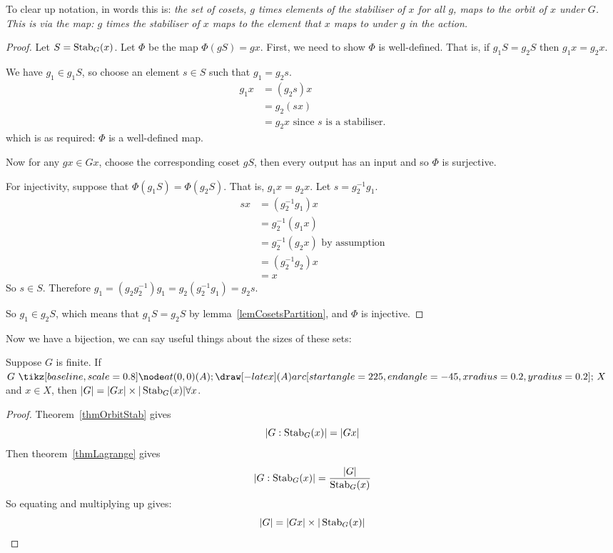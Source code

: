 \documentclass[../Main.tex]{subfiles}
\begin{document}
To clear up notation, in words this is: \textit{the set of cosets, $g$ times elements of the stabiliser of $x$ for all $g$, maps to the orbit of $x$ under $G$. This is via the map: $g$ times the stabiliser of $x$ maps to the element that $x$ maps to under $g$ in the action.}
\begin{proof}
    Let $S = \operatorname{Stab}_G(x)$. Let $\Phi$ be the map $\Phi(gS) = gx$.
    First, we need to show $\Phi$ is well-defined. That is, if $g_1 S = g_2 S$ then $g_1 x = g_2 x$.\par
    We have $g_1 \in g_1 S$, so choose an element $s \in S$ such that $g_1 = g_2 s$.
    \begin{align*}
        g_1 x &= (g_2 s) x \\
        &= g_2 (sx) \\
        &= g_2 x \text{ since } s \text{ is a stabiliser.}
    \end{align*}
    which is as required: $\Phi$ is a well-defined map.\par
    Now for any $gx \in Gx$, choose the corresponding coset $gS$, then every output has an input and so $\Phi$ is surjective.\par
    For injectivity, suppose that $\Phi(g_1 S) = \Phi(g_2 S)$. That is, $g_1 x = g_2 x$. Let $s = g_2^{-1} g_1$.
    \begin{align*}
        s x &= (g_2^{-1} g_1) x \\
        &= g_2^{-1} (g_1 x) \\
        &= g_2^{-1} (g_2 x) \text{ by assumption} \\
        &= (g_2^{-1} g_2) x \\
        &= x
    \end{align*}
    So $s \in S$. Therefore $g_1 = (g_2 g_2^{-1}) g_1 = g_2 (g_2^{-1} g_1) = g_2 s$.\par
    So $g_1 \in g_2 S$, which means that $g_1 S = g_2 S$ by lemma~\ref{lemCosetsPartition}, and $\Phi$ is injective.
\end{proof}
Now we have a bijection, we can say useful things about the sizes of these sets:
\begin{corollary}
    Suppose $G$ is finite. If $G \actson X$ and $x \in X$, then $|G| = |Gx| \times |\operatorname{Stab}_G(x)| \forall x$.
    \label{corOrbitStabSizes}
\end{corollary}
\begin{proof}
    Theorem~\ref{thmOrbitStab} gives 
    \begin{equation*}
        |G : \operatorname{Stab}_G(x)| = |Gx|
    \end{equation*}
    Then theorem~\ref{thmLagrange} gives
    \begin{equation*}
        |G : \operatorname{Stab}_G(x)| = \frac{|G|}{\operatorname{Stab}_G(x)}
    \end{equation*}
    So equating and multiplying up gives:
    \begin{equation}
        |G| = |Gx| \times |\operatorname{Stab}_G(x)|
        \label{eqnOrbitStab}
    \end{equation}
\end{proof}
\end{document}
